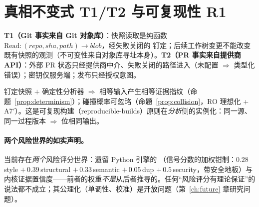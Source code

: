 \section{真相不变式 T1/T2 与可复现性 R1}

\begin{proposition}[真相不变式]\label{prop:truth}
\textbf{T1（Git 事实来自 Git 对象库）}：快照读取是纯函数 $\mathrm{Read}:(repo,sha,path)\to blob$，经失败关闭的  钉定；后续工作树变更不能改变既有快照的观测（不可变性来自对象库寻址本身）。\textbf{T2（PR 事实来自提供商 API）}：外部 PR 状态只经提供商中介、失败关闭的路径进入（未配置 $\Rightarrow$ 类型化错误）；密钥仅服务端；发布只经授权意图。
\end{proposition}

\begin{proposition}[可复现性 R1]\label{prop:repro}
钉定快照 $+$ 确定性分析器 $\Rightarrow$ 相等输入产生相等证据指纹（命题~\ref{prop:determinism}）；碰撞概率可忽略（命题~\ref{prop:collision}，RO 理想化 + A7$'$）。这是可复现构建（reproducible-builds）原则在\emph{分析}侧的实例化：同一源、同一过程版本 $\Rightarrow$ 位相同输出。
\end{proposition}

\paragraph{两个风险世界的如实声明。}
当前存在\emph{两个}风险评分世界：遗留 Python 引擎的 （信号分数的加权钳制：$0.28\,$style $+\,0.39\,$structural $+\,0.33\,$semantic $+\,0.05\,$dup $+\,0.5\,$security，带安全地板）与内核证据置信度——前者的权重\emph{不是}从后者推导的。任何“风险评分有理论保证”的说法都不成立；其公理化（单调性、校准）是开放问题（第~\ref{ch:future} 章研究问题）。
